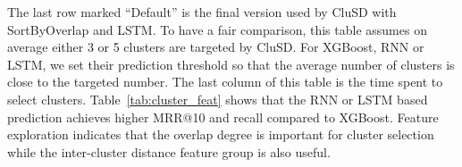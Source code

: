 The last row marked ``Default'' is the final version used by CluSD with SortByOverlap and LSTM.
To have a fair comparison, this table assumes on average either 3 or 5 clusters are targeted by CluSD.
For XGBoost, RNN or LSTM, we set their prediction threshold so that 
the average number of clusters is close to the targeted number.
The last column of this table is the time spent to select clusters. 
Table~\ref{tab:cluster_feat} shows that  the RNN or LSTM based prediction achieves  higher MRR@10 and recall compared to 
XGBoost. 
Feature exploration indicates that the overlap degree is important for  cluster selection
while the inter-cluster distance feature group is also useful. 


 





